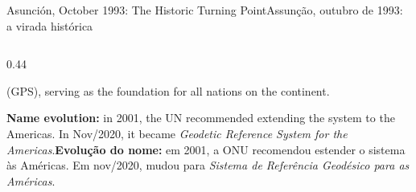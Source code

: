 \documentclass[aspectratio=169,11pt]{beamer}
\newcommand{\tr}[2]{\ifEN#2\else#1\fi}
\begin{document}
\begin{frame}{\tr{Assunção, outubro de 1993: a virada histórica}{Asunción, October 1993: The Historic Turning Point}}
\begin{columns}[onlytextwidth]
\begin{column}{0.44\textwidth}
\begin{regra}
{        (GPS), serving as the foundation for all nations on the continent.}
      \end{regra}
      \vspace{0.2cm}
      \begin{cuidado}
        \tiny \tr{\textbf{Evolução do nome:} em 2001, a ONU recomendou estender o sistema às
        Américas. Em nov/2020, mudou para \emph{Sistema de Referência Geodésico para as Américas}.}{
        \textbf{Name evolution:} in 2001, the UN recommended extending the system to the Americas.
        In Nov/2020, it became \emph{Geodetic Reference System for the Americas}.}
      \end{cuidado}
    \end{column}
  \end{columns}
\end{frame}
\end{document}
